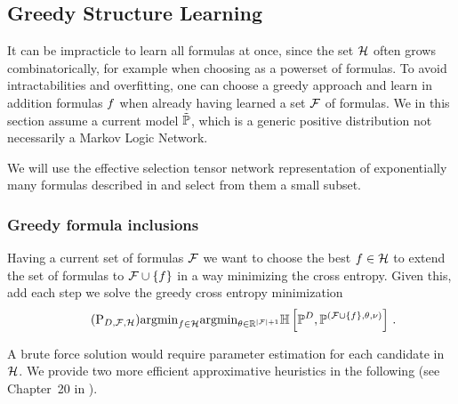 






\subsection{Greedy Structure Learning}


It can be impracticle to learn all formulas at once, since the set $\mathcal{H}$ often grows combinatorically, for example when choosing as a powerset of formulas.
To avoid intractabilities and overfitting, one can choose a greedy approach and learn in addition formulas $f$ when already having learned a set $\mathcal{F}$ of formulas.
We in this section assume a current model $\tilde{\mathbb{P}}$, which is a generic positive distribution not necessarily a Markov Logic Network. %

% 
We will use the effective selection tensor network representation of exponentially many formulas described in  and select from them a small subset.



\subsubsection{Greedy formula inclusions}

Having a current set of formulas $\mathcal{F}$ we want to choose the best $f\in\mathcal{H}$ to extend the set of formulas to $\mathcal{F}\cup\{f\}$ in a way minimizing the cross entropy.
Given this, add each step we solve the greedy cross entropy minimization
\begin{align}\label{prob:perfectGreedy}\tag{$\mathrm{P}_{\datamap,\formulaset,\fselectionmap}$}
	\argmin_{\formula\in\fselectionmap} \argmin_{\canparam\in\rr^{\cardof{\formulaset}+1}} 
	\centropyof{\empdistribution}{\expdistof{(\formulaset\cup\{\formula\},\canparam,\basemeasure)}} \, . 
\end{align}


A brute force solution would require parameter estimation for each candidate in $\mathcal{H}$.
We provide two more efficient approximative heuristics in the following (see Chapter~20 in \cite{koller_probabilistic_2009}).


